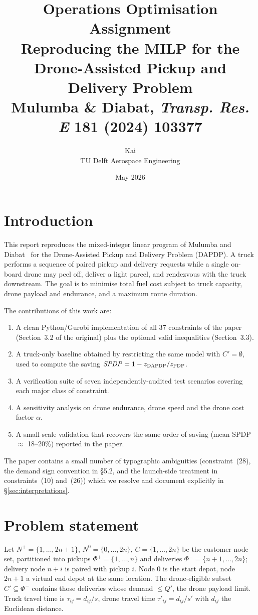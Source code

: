 \documentclass[11pt,a4paper]{article}
\title{Operations Optimisation Assignment\\
\large Reproducing the MILP for the Drone-Assisted Pickup and Delivery Problem\\
{\small Mulumba \& Diabat, \emph{Transp. Res. E} 181 (2024) 103377}}
\author{Kai\\TU Delft Aerospace Engineering}
\date{May 2026}
\newcommand{\Nplus}{N^{+}}
\newcommand{\NO}{N^{0}}
\newcommand{\Cprime}{C'}
\newcommand{\dapdp}{\textsc{DAPDP}}
\newcommand{\pdp}{\textsc{PDP}}
\begin{document}
\maketitle

\section{Introduction}

This report reproduces the mixed-integer linear program of Mulumba and
Diabat~\cite{mulumba2024} for the Drone-Assisted Pickup and Delivery Problem
(\dapdp). A truck performs a sequence of paired pickup and delivery requests
while a single on-board drone may peel off, deliver a light parcel, and
rendezvous with the truck downstream. The goal is to minimise total fuel cost
subject to truck capacity, drone payload and endurance, and a maximum route
duration.

The contributions of this work are:
\begin{enumerate}
\item A clean Python/Gurobi implementation of all $37$ constraints of the
paper (Section~3.2 of the original) plus the optional valid inequalities
(Section~3.3).
\item A truck-only baseline obtained by restricting the same model with
$\Cprime{=}\emptyset$, used to compute the saving $\mathit{SPDP} = 1 -
z_{\dapdp} / z_{\pdp}$.
\item A verification suite of seven independently-audited test scenarios
covering each major class of constraint.
\item A sensitivity analysis on drone endurance, drone speed and the drone
cost factor $\alpha$.
\item A small-scale validation that recovers the same order of saving (mean
SPDP $\approx$ 18--20\%) reported in the paper.
\end{enumerate}

The paper contains a small number of typographic ambiguities
(constraint~(28), the demand sign convention in \S5.2, and the launch-side
treatment in constraints~(10) and~(26)) which we resolve and document
explicitly in \S\ref{sec:interpretations}.

\section{Problem statement}

Let $\Nplus = \{1,\dots,2n+1\}$, $\NO = \{0,\dots,2n\}$, $C =
\{1,\dots,2n\}$ be the customer node set, partitioned into pickups
$\Phi^{+} = \{1,\dots,n\}$ and deliveries $\Phi^{-} = \{n{+}1,\dots,2n\}$;
delivery node $n{+}i$ is paired with pickup $i$. Node $0$ is the start
depot, node $2n{+}1$ a virtual end depot at the same location. The
drone-eligible subset $\Cprime \subseteq \Phi^{-}$ contains those
deliveries whose demand $\le Q'$, the drone payload limit. Truck travel
time is $\tau_{ij} = d_{ij}/s$, drone travel time $\tau'_{ij} = d_{ij}/s'$
with $d_{ij}$ the Euclidean distance.
\end{document}
